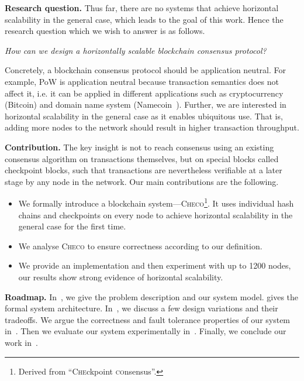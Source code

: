 \textbf{Research question.\quad}
Thus far, there are no systems that achieve horizontal scalability in the general case,
which leads to the goal of this work.
Hence the research question which we wish to answer is as follows.
\begin{displayquote}
    \emph{How can we design a horizontally scalable blockchain consensus protocol?}
    \end{displayquote}
Concretely, a blockchain consensus protocol should be application neutral.
For example, PoW is application neutral because transaction semantics does not affect it,
i.e. it can be applied in different applications such as cryptocurrency (Bitcoin) and domain name system (Namecoin~\cite{namecoin}).
Further, we are interested in horizontal scalability in the general case as it enables ubiquitous use.
That is, adding more nodes to the network should result in higher transaction throughput.

\textbf{Contribution.\quad}
The key insight is not to reach consensus using an existing consensus algorithm on transactions themselves,
but on special blocks called checkpoint blocks,
such that transactions are nevertheless verifiable at a later stage by any node in the network.
Our main contributions are the following.
\begin{itemize}
    \item We formally introduce a blockchain system---\textsc{Checo}\footnote{Derived from ``\textsc{Che}ckpoint \textsc{co}nsensus''.}.
        It uses individual hash chains and checkpoints on every node to achieve
        horizontal scalability in the general case for the first time.
    \item We analyse \textsc{Checo} to ensure correctness according to our definition.
    \item We provide an implementation and then experiment with up to 1200 nodes,
        our results show strong evidence of horizontal scalability.
\end{itemize}

\textbf{Roadmap.\quad}
In~,
we give the problem description and our system model.
 gives the formal system architecture.
In~, we discuss a few design variations and their tradeoffs.
We argue the correctness and fault tolerance properties of our system in~.
Then we evaluate our system experimentally in~.
Finally, we conclude our work in~.
